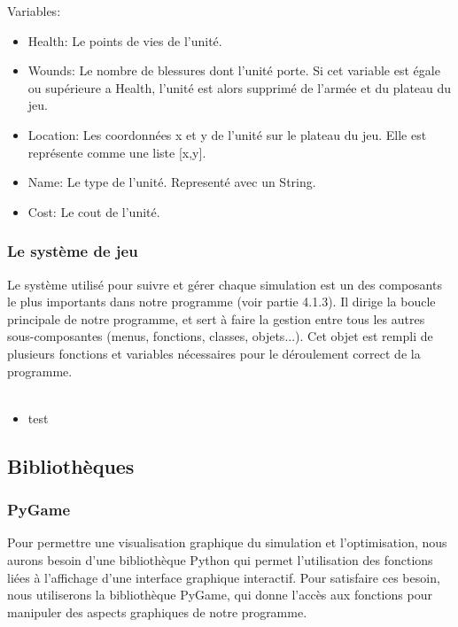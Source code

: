 \documentclass[a4paper, 11pt]{article}
\begin{document}
Variables: \\

\begin{itemize}

\item{Health: Le points de vies de l'unité.}
\item{Wounds: Le nombre de blessures dont l'unité porte. Si cet variable est égale ou supérieure a Health, l'unité est alors supprimé de l'armée et du plateau du jeu.}
\item{Location: Les coordonnées x et y de l'unité sur le plateau du jeu. Elle est représente comme une liste [x,y].}
\item{Name: Le type de l'unité. Representé avec un String.}
\item{Cost: Le cout de l'unité.}

\end{itemize}

\subsubsection{Le système de jeu}

Le système utilisé pour suivre et gérer chaque simulation est un des composants le plus importants dans notre programme (voir partie 4.1.3). Il dirige la boucle principale de notre programme, et sert à faire la gestion entre tous les autres sous-composantes (menus, fonctions, classes, objets...).
Cet objet est rempli de plusieurs fonctions et variables nécessaires pour le déroulement correct de la programme. \\ \\

\begin{itemize}

\item{test}

\end{itemize}

\subsection{Bibliothèques}

\subsubsection{PyGame}

Pour permettre une visualisation graphique du simulation et l'optimisation, nous aurons besoin d'une bibliothèque Python qui permet l'utilisation des fonctions liées à l'affichage d'une interface graphique interactif.
Pour satisfaire ces besoin, nous utiliserons la bibliothèque PyGame, qui donne l'accès aux fonctions pour manipuler des aspects graphiques de notre programme.
\end{document}
